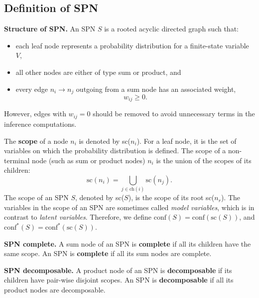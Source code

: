 \documentclass{article}
\begin{document}
\subsection{Definition of SPN}
\begin{theorem}
    \textbf{Structure of SPN.} An SPN $S$ is a rooted acyclic directed graph such that:
    \begin{itemize}
        \item each leaf node represents a probability distribution for a finite-state variable $V$,
        \item all other nodes are either of type sum or product, and
        \item every edge $n_i \rightarrow n_j$ outgoing from a sum node has an associated weight, $$w_{ij} \geq 0.$$
    \end{itemize}
     However, edges with $w_{ij} = 0$ should be removed to avoid unnecessary terms in the inference computations. 
\end{theorem}

\noindent The \textbf{scope} of a node $n_i$ is denoted by sc($n_i$). For a leaf node, it is the set of variables on which the probability distribution is defined. The scope of a non-terminal node (such as sum or product nodes) $n_i$ is the union of the scopes of its children:
$$
    \text{sc}(n_i) = \bigcup_{j \in \text{ch}(i)} \text{sc}(n_j).
$$
\noindent The scope of an SPN $S$, denoted by sc($S$), is the scope of its root sc($n_r$). The variables in the scope of an SPN are sometimes called \textit{model variables}, which is in contrast to \textit{latent variables}. Therefore, we define $\text{conf}(S) = \text{conf}(\text{sc}(S))$, and $\text{conf}^*(S) = \text{conf}^*(\text{sc}(S))$.
\\
\begin{theorem}
    \textbf{SPN complete.} A sum node of an SPN is \textbf{complete} if all its children have the same scope. An SPN is \textbf{complete} if all its sum nodes are complete. 
\end{theorem}
\begin{theorem}
    \textbf{SPN decomposable.} A product node of an SPN is \textbf{decomposable} if its children have pair-wise disjoint scopes. An SPN is \textbf{decomposable} if all its product nodes are decomposable. 
\end{theorem}
\end{document}

